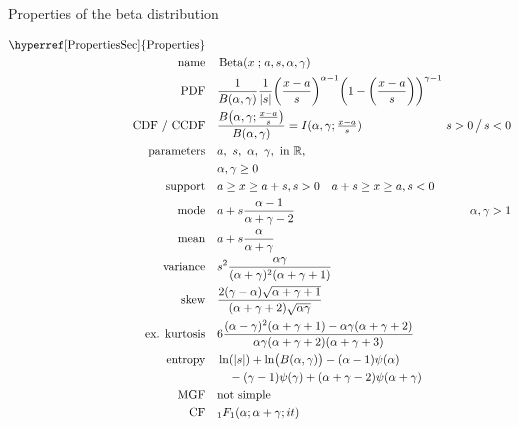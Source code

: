 

\begin{table*}[tp]
\caption[Beta distribution -- Properties]{Properties of the beta distribution}
 \begin{align*}
 \text{\hyperref[PropertiesSec]{Properties}}  \quad& \\
\text{name} \quad & \op{Beta}(x\given a,s,\alpha, \gamma) 	\checked
\\
\text{PDF}\quad &    \frac{1}{B(\alpha, \gamma)}\frac{1}{ \Left|s\Right|}
\Left(\frac{x-a}{s} \Right)^{\alpha -1} \Left (1-\Left(\frac{x-a}{s}\Right)\Right)^{\gamma -1}	\checked
\hspace{-8em}
\\
\text{CDF / CCDF} \quad  & 
 \frac{B\Left( \alpha,\gamma; \sfrac{x-a}{s} \Right)}{B(\alpha,\gamma)} = I( \alpha,\gamma; \sfrac{x-a}{s})
 \checked
& {s} >0 \,\big/ \, {s} <0
\\ 
\text{parameters}\quad &   a,\ s,\ \alpha,\ \gamma, \text{ in } \Real, \\ &  \alpha,\gamma\geq0	\checked
\\
\text{support} \quad &  a \geq x \geq a+s , s>0 \quad a+s \geq x \geq a , s<0 
\\
\text{mode} \quad  &a + s \frac{\alpha-1}{\alpha+\gamma-2}\checked  & \alpha,\gamma > 1
\\
\text{mean} \quad  &   a + s \frac{\alpha}{\alpha+\gamma}	\checked
\\
\text{variance} \quad   & s^2 \frac{\alpha\gamma}{(\alpha+\gamma)^2(\alpha+\gamma+1)} \checked
\\
\text{skew} \quad  &   \frac{2(\gamma-\alpha) \sqrt{\alpha+\gamma+1} }{(\alpha+\gamma+2)\sqrt{\alpha\gamma} } \checked
\\
\text{ex. kurtosis} \quad  &  6\frac{(\alpha-\gamma)^2(\alpha+\gamma+1) - \alpha\gamma(\alpha+\gamma+2) }{\alpha\gamma(\alpha+\gamma+2)(\alpha+\gamma+3)} \checked
\\
\text{entropy} \quad  &  \ln(|s|) + \ln\bigl(B(\alpha,\gamma)\bigr)-(\alpha-1)\psi(\alpha)
\\ &\quad {}-(\gamma-1)\psi(\gamma)+(\alpha+\gamma-2)\psi(\alpha+\gamma) \checked
\\
\text{MGF} \quad  &  \text{not simple} 
\\
\text{CF} \quad  &  {}_{1}F_{1}(\alpha; \alpha+\gamma ; i t) \checked
\end{align*}
\end{table*}

